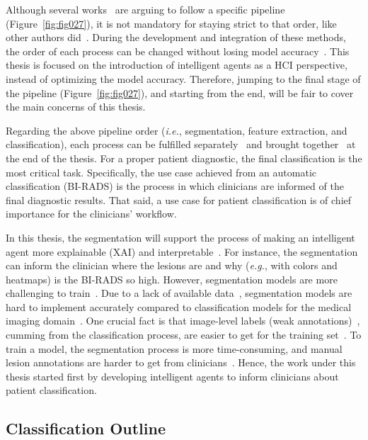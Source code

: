Although several works~\cite{9247957} are arguing to follow a specific pipeline (Figure~\ref{fig:fig027}), it is not mandatory for staying strict to that order, like other authors did~\cite{8451510, AGRAWAL201927}.
During the development and integration of these methods, the order of each process can be changed without losing model accuracy~\cite{8462671}.
This thesis is focused on the introduction of intelligent agents as a \ac{HCI} perspective, instead of optimizing the model accuracy.
Therefore, jumping to the final stage of the pipeline (Figure~\ref{fig:fig027}), and starting from the end, will be fair to cover the main concerns of this thesis.

Regarding the above pipeline order ({\it i.e.}, segmentation, feature extraction, and classification), each process can be fulfilled separately~\cite{8451510, AGRAWAL201927} and brought together~\cite{10.1007/978-3-030-00934-2_99} at the end of the thesis.
For a proper patient diagnostic, the final classification is the most critical task.
Specifically, the use case achieved from an automatic classification (\ac{BI-RADS}) is the process in which clinicians are informed of the final diagnostic results.
That said, a use case for patient classification is of chief importance for the clinicians' workflow.

In this thesis, the segmentation will support the process of making an intelligent agent more explainable (\ac{XAI}) and interpretable~\cite{8622433}.
For instance, the segmentation can inform the clinician where the lesions are and why ({\it e.g.}, with colors and heatmaps) is the \ac{BI-RADS} so high.
However, segmentation models are more challenging to train~\cite{hesamian2019deep}.
Due to a lack of available data~\cite{ahmed2020images}, segmentation models are hard to implement accurately compared to classification models for the medical imaging domain~\cite{murtaza2019deep}.
One crucial fact is that image-level labels (weak annotations)~\cite{10.1145/3373017.3373051}, cumming from the classification process, are easier to get for the training set~\cite{TAJBAKHSH2020101693}.
To train a model, the segmentation process is more time-consuming, and manual lesion annotations are harder to get from clinicians~\cite{10.1007/978-3-030-59719-1_44}.
Hence, the work under this thesis started first by developing intelligent agents to inform clinicians about patient classification.

\subsection{Classification Outline}
\label{sec:app004001001}


